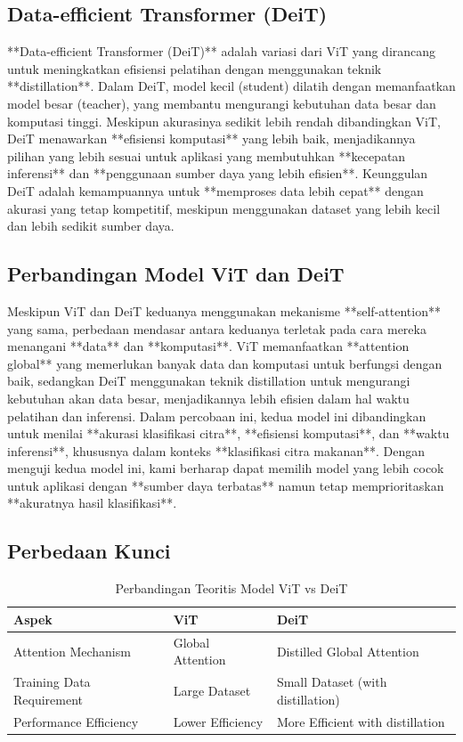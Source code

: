 \documentclass[11pt,a4paper]{article}
\begin{document}
\subsection{Data-efficient Transformer (DeiT)}
**Data-efficient Transformer (DeiT)** adalah variasi dari ViT yang dirancang untuk meningkatkan efisiensi pelatihan dengan menggunakan teknik **distillation**. Dalam DeiT, model kecil (student) dilatih dengan memanfaatkan model besar (teacher), yang membantu mengurangi kebutuhan data besar dan komputasi tinggi. Meskipun akurasinya sedikit lebih rendah dibandingkan ViT, DeiT menawarkan **efisiensi komputasi** yang lebih baik, menjadikannya pilihan yang lebih sesuai untuk aplikasi yang membutuhkan **kecepatan inferensi** dan **penggunaan sumber daya yang lebih efisien**. Keunggulan DeiT adalah kemampuannya untuk **memproses data lebih cepat** dengan akurasi yang tetap kompetitif, meskipun menggunakan dataset yang lebih kecil dan lebih sedikit sumber daya.

\subsection{Perbandingan Model ViT dan DeiT}
Meskipun ViT dan DeiT keduanya menggunakan mekanisme **self-attention** yang sama, perbedaan mendasar antara keduanya terletak pada cara mereka menangani **data** dan **komputasi**. ViT memanfaatkan **attention global** yang memerlukan banyak data dan komputasi untuk berfungsi dengan baik, sedangkan DeiT menggunakan teknik distillation untuk mengurangi kebutuhan akan data besar, menjadikannya lebih efisien dalam hal waktu pelatihan dan inferensi. Dalam percobaan ini, kedua model ini dibandingkan untuk menilai **akurasi klasifikasi citra**, **efisiensi komputasi**, dan **waktu inferensi**, khususnya dalam konteks **klasifikasi citra makanan**. Dengan menguji kedua model ini, kami berharap dapat memilih model yang lebih cocok untuk aplikasi dengan **sumber daya terbatas** namun tetap memprioritaskan **akuratnya hasil klasifikasi**.


\subsection{Perbedaan Kunci}
\begin{table}[h]
\caption{Perbandingan Teoritis Model ViT vs DeiT}
\label{tab:theory-comparison}
\centering
\begin{tabular}{|l|l|l|}
\hline
\textbf{Aspek} & \textbf{ViT} & \textbf{DeiT} \\ \hline
Attention Mechanism & Global Attention & Distilled Global Attention \\ \hline
Training Data Requirement & Large Dataset & Small Dataset (with distillation) \\ \hline
Performance Efficiency & Lower Efficiency & More Efficient with distillation \\ \hline
\end{tabular}
\end{table}
\end{document}
